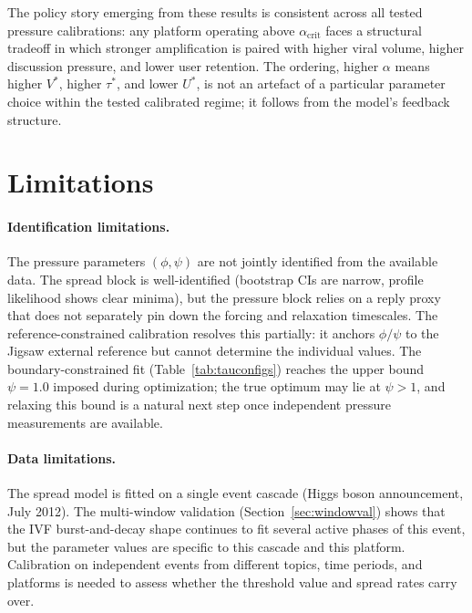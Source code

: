 \documentclass[11pt]{article}
\begin{document}
The policy story emerging from these results is consistent across all tested pressure calibrations: any platform operating above $\alpha_{\mathrm{crit}}$ faces a structural tradeoff in which stronger amplification is paired with higher viral volume, higher discussion pressure, and lower user retention. The ordering, higher $\alpha$ means higher $V^*$, higher $\tau^*$, and lower $U^*$, is not an artefact of a particular parameter choice within the tested calibrated regime; it follows from the model's feedback structure.

\clearpage
\section{Limitations}
\label{sec:limitations}

\paragraph{Identification limitations.}
The pressure parameters $(\phi, \psi)$ are not jointly identified from the available data. The spread block is well-identified (bootstrap CIs are narrow, profile likelihood shows clear minima), but the pressure block relies on a reply proxy that does not separately pin down the forcing and relaxation timescales. The reference-constrained calibration resolves this partially: it anchors $\phi/\psi$ to the Jigsaw external reference but cannot determine the individual values. The boundary-constrained fit (Table~\ref{tab:tauconfigs}) reaches the upper bound $\psi = 1.0$ imposed during optimization; the true optimum may lie at $\psi > 1$, and relaxing this bound is a natural next step once independent pressure measurements are available.

\paragraph{Data limitations.}
The spread model is fitted on a single event cascade (Higgs boson announcement, July 2012). The multi-window validation (Section~\ref{sec:windowval}) shows that the IVF burst-and-decay shape continues to fit several active phases of this event, but the parameter values are specific to this cascade and this platform. Calibration on independent events from different topics, time periods, and platforms is needed to assess whether the threshold value and spread rates carry over.
\end{document}
